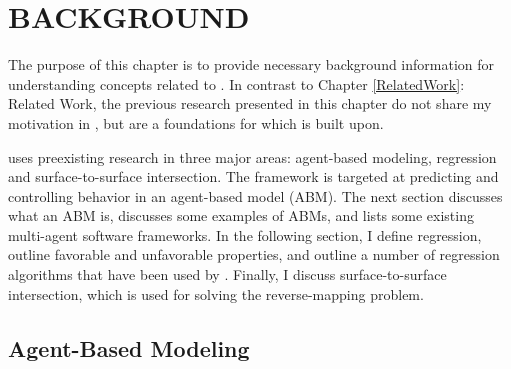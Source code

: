 \chapter{BACKGROUND}
\thispagestyle{plain}

\label{Background}

The purpose of this chapter is to provide necessary background information for understanding concepts related to \framework.
In contrast to Chapter \ref{RelatedWork}: Related Work, the previous research presented in this chapter do not share my motivation in \fw, but are a foundations for which \fw is built upon. 

\fw uses preexisting research in three major areas:
agent-based modeling, regression and surface-to-surface intersection.
The framework is targeted at predicting and controlling behavior in an agent-based model (ABM).
The next section discusses what an ABM is, discusses some examples of ABMs, and lists some existing multi-agent software frameworks.
In the following section, I define regression, outline favorable and unfavorable properties, and outline a number of regression algorithms that have been used by \fw.
Finally, I discuss surface-to-surface intersection, which is used for solving the reverse-mapping problem.


\section{Agent-Based Modeling}

